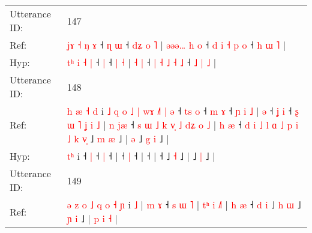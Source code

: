 \documentclass[10pt]{article}
\DeclareRobustCommand{\hl}[1]{{\textcolor{red}{#1}}}
\begin{document}
\begin{longtable}{ll}
 \\
\midrule
Utterance ID: & 147 \\
Ref: & \hl{j}\hl{ɤ} \hl{˧} \hl{ŋ} \hl{ɤ} ˧\hl{ }\hl{ɳ} \hl{ɯ} ˧\hl{ }\hl{d}\hl{ʑ} \hl{o} \hl{˥} |\hl{ }\hl{ə}\hl{ə}\hl{ə}\hl{…} \hl{h} \hl{o} ˧ \hl{d} \hl{i} \hl{˧} \hl{p} \hl{o} ˧ \hl{h} \hl{ɯ} \hl{˥} |
 \\
Hyp: & \hl{t}\hl{ʰ} \hl{i} \hl{˧} \hl{|} ˧\hl{}\hl{} \hl{|} ˧\hl{}\hl{}\hl{} \hl{|} \hl{˧} |\hl{}\hl{}\hl{}\hl{}\hl{} \hl{˧} \hl{|} ˧ \hl{|} \hl{˧} \hl{˩} \hl{˧} \hl{˩} ˧ \hl{˩} \hl{|} \hl{˩} |
 \\
\midrule
Utterance ID: & 148 \\
Ref: & \hl{h}\hl{ }\hl{æ}\hl{ }\hl{˧}\hl{ }\hl{d} i\hl{ }\hl{˩}\hl{ }\hl{q}\hl{ }\hl{o}\hl{ }\hl{˩}\hl{ }\hl{|}\hl{ }\hl{w}\hl{ɤ}\hl{ }\hl{˩}\hl{˥}\hl{ }\hl{|}\hl{ }\hl{ə} ˧\hl{ }\hl{t}\hl{s} \hl{o} ˧\hl{ }\hl{m} \hl{ɤ} ˧\hl{ }\hl{ɲ}\hl{ }\hl{i}\hl{ }\hl{˩} |\hl{ }\hl{ə} ˧\hl{ }\hl{ʝ} \hl{i} ˧\hl{ }\hl{ʂ}\hl{ }\hl{ɯ}\hl{ }\hl{˥}\hl{ }\hl{ʝ}\hl{ }\hl{i}\hl{ }\hl{˩} |\hl{ }\hl{n}\hl{ }\hl{j}\hl{æ} ˧\hl{ }\hl{s}\hl{ }\hl{ɯ}\hl{ }\hl{˩}\hl{ }\hl{k}\hl{ }\hl{v}\hl{̩}\hl{ }\hl{˩}\hl{ }\hl{d}\hl{ʑ}\hl{ }\hl{o}\hl{ }\hl{˩} |\hl{ }\hl{h}\hl{ }\hl{æ} ˧\hl{ }\hl{d}\hl{ }\hl{i}\hl{ }\hl{˩}\hl{ }\hl{l}\hl{ }\hl{ɑ}\hl{ }\hl{˩}\hl{ }\hl{p}\hl{ }\hl{i}\hl{ }\hl{˩}\hl{ }\hl{k}\hl{ }\hl{v}\hl{̩} ˩\hl{ }\hl{m} \hl{æ} ˩ |\hl{ }\hl{ə} ˩\hl{ }\hl{g} \hl{i} ˩ |
 \\
Hyp: & \hl{}\hl{}\hl{}\hl{}\hl{}\hl{t}\hl{ʰ} i\hl{}\hl{}\hl{}\hl{}\hl{}\hl{}\hl{}\hl{}\hl{}\hl{}\hl{}\hl{}\hl{}\hl{}\hl{}\hl{}\hl{}\hl{}\hl{}\hl{} ˧\hl{}\hl{}\hl{} \hl{|} ˧\hl{}\hl{} \hl{|} ˧\hl{}\hl{}\hl{}\hl{}\hl{}\hl{} |\hl{}\hl{} ˧\hl{}\hl{} \hl{|} ˧\hl{}\hl{}\hl{}\hl{}\hl{}\hl{}\hl{}\hl{}\hl{}\hl{}\hl{}\hl{} |\hl{}\hl{}\hl{}\hl{}\hl{} ˧\hl{}\hl{}\hl{}\hl{}\hl{}\hl{}\hl{}\hl{}\hl{}\hl{}\hl{}\hl{}\hl{}\hl{}\hl{}\hl{}\hl{}\hl{}\hl{}\hl{} |\hl{}\hl{}\hl{}\hl{} ˧\hl{}\hl{}\hl{}\hl{}\hl{}\hl{}\hl{}\hl{}\hl{}\hl{}\hl{}\hl{}\hl{}\hl{}\hl{}\hl{}\hl{}\hl{}\hl{}\hl{}\hl{}\hl{}\hl{} ˩\hl{}\hl{} \hl{˧} ˩ |\hl{}\hl{} ˩\hl{}\hl{} \hl{|} ˩ |
 \\
\midrule
Utterance ID: & 149 \\
Ref: & \hl{ə}\hl{ }\hl{z}\hl{ }\hl{o}\hl{ }\hl{˩}\hl{ }\hl{q}\hl{ }\hl{o}\hl{ }\hl{˧}\hl{ }\hl{ɲ} i \hl{˩} |\hl{ }\hl{m}\hl{ }\hl{ɤ} ˧\hl{ }\hl{s}\hl{ }\hl{ɯ}\hl{ }\hl{˥} |\hl{ }\hl{t}\hl{ʰ}\hl{ }\hl{i} \hl{˩}\hl{˥} |\hl{ }\hl{h}\hl{ }\hl{æ} ˧ \hl{d} \hl{i} ˩\hl{ }\hl{h} \hl{ɯ} ˩\hl{ }\hl{ɲ} \hl{i} ˩ |\hl{ }\hl{p}\hl{ }\hl{i} \hl{˧} |
 \\

\end{longtable}
\end{document}
